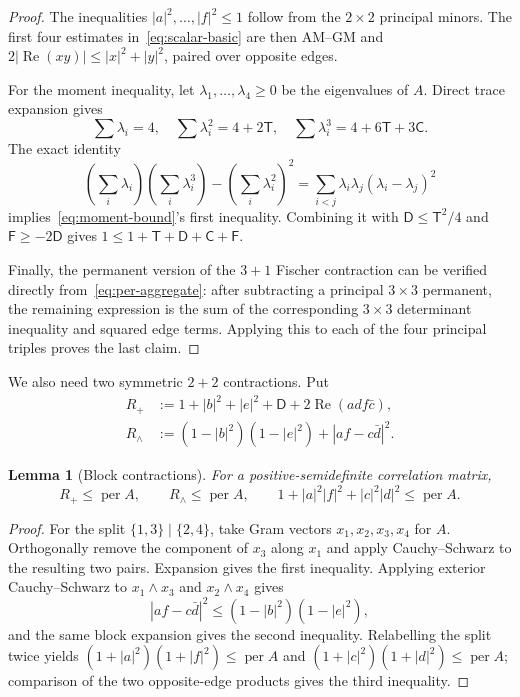 \documentclass[11pt]{article}
\newtheorem{lemma}[theorem]{Lemma}
\theoremstyle{definition}
\newcommand{\per}{\operatorname{per}}
\newcommand{\Rea}{\operatorname{Re}}
\begin{document}
\begin{proof}
The inequalities $|a|^2,\ldots,|f|^2\leq1$ follow from the $2\times2$
principal minors.  The first four estimates in~\eqref{eq:scalar-basic} are
then AM--GM and
$2|\Rea(xy)|\leq|x|^2+|y|^2$, paired over opposite edges.

For the moment inequality, let $\lambda_1,\dots,\lambda_4\geq0$ be the
eigenvalues of $A$.  Direct trace expansion gives
\[
 \sum\lambda_i=4,\quad
 \sum\lambda_i^2=4+2\mathsf T,\quad
 \sum\lambda_i^3=4+6\mathsf T+3\mathsf C.
\]
The exact identity
\[
 \left(\sum_i\lambda_i\right)\left(\sum_i\lambda_i^3\right)
 -\left(\sum_i\lambda_i^2\right)^2
 =\sum_{i<j}\lambda_i\lambda_j(\lambda_i-\lambda_j)^2
\]
implies~\eqref{eq:moment-bound}'s first inequality.  Combining it with
$\mathsf D\leq\mathsf T^2/4$ and $\mathsf F\geq-2\mathsf D$ gives
$1\leq1+\mathsf T+\mathsf D+\mathsf C+\mathsf F$.

Finally, the permanent version of the $3+1$ Fischer contraction can be
verified directly from~\eqref{eq:per-aggregate}: after subtracting a
principal $3\times3$ permanent, the remaining expression is the sum of the
corresponding $3\times3$ determinant inequality and squared edge terms.
Applying this to each of the four principal triples proves the last claim.
\end{proof}

We also need two symmetric $2+2$ contractions.  Put
\begin{align}
 R_+&:=1+|b|^2+|e|^2+\mathsf D
       +2\Rea(a d f\bar c),\label{eq:Rplus}\\
 R_\wedge&:=(1-|b|^2)(1-|e|^2)+|af-c\bar d|^2.\label{eq:Rwedge}
\end{align}

\begin{lemma}[Block contractions]\label{lem:block-contractions}
For a positive-semidefinite correlation matrix,
\begin{equation}\label{eq:block-bounds}
 R_+\leq\per A,\qquad R_\wedge\leq\per A,\qquad
 1+|a|^2|f|^2+|c|^2|d|^2\leq\per A.
\end{equation}
\end{lemma}

\begin{proof}
For the split $\{1,3\}\mid\{2,4\}$, take Gram vectors
$x_1,x_2,x_3,x_4$ for $A$.  Orthogonally remove the component of $x_3$
along $x_1$ and apply Cauchy--Schwarz to the resulting two pairs.  Expansion
gives the first inequality.  Applying exterior Cauchy--Schwarz to
$x_1\wedge x_3$ and $x_2\wedge x_4$ gives
\[
 |af-c\bar d|^2\leq(1-|b|^2)(1-|e|^2),
\]
and the same block expansion gives the second inequality.  Relabelling the
split twice yields
$(1+|a|^2)(1+|f|^2)\leq\per A$ and
$(1+|c|^2)(1+|d|^2)\leq\per A$; comparison of the two opposite-edge
products gives the third inequality.
\end{proof}
\end{document}
